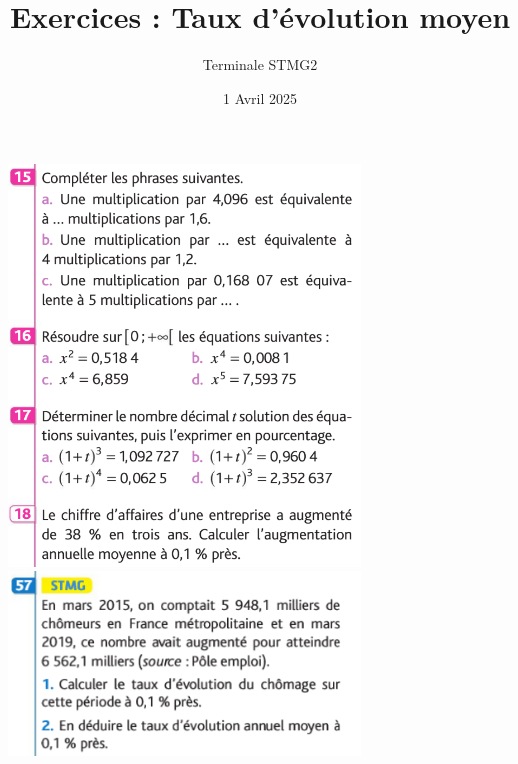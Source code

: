 \documentclass{article}
\title{Exercices : Taux d'évolution moyen}
\author{Terminale STMG2}
\date{1\ier{} Avril 2025}
\begin{document}
\maketitle

\begin{center}
\includegraphics[width=0.7\textwidth]{Exercices.png}
\includegraphics[width=0.7\textwidth]{Application.png}
\end{center}
\end{document}
